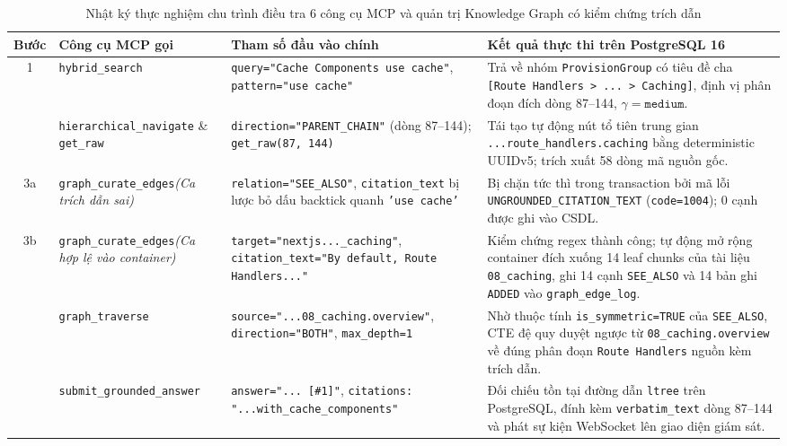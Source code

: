 \begin{table}[H]
\centering
\caption{Nhật ký thực nghiệm chu trình điều tra 6 công cụ MCP và quản trị Knowledge Graph có kiểm chứng trích dẫn}
\label{tab:mcp_kg_trajectory}
\scriptsize\setlength{\tabcolsep}{3.5pt}\begin{tabularx}{\textwidth}{c>{\raggedright\arraybackslash}p{3.0cm}>{\raggedright\arraybackslash}p{4.1cm}>{\raggedright\arraybackslash}X}
\toprule
\textbf{Bước} & \textbf{Công cụ MCP gọi} & \textbf{Tham số đầu vào chính} & \textbf{Kết quả thực thi trên PostgreSQL 16} \\
\midrule
1 & \texttt{hybrid\_\allowbreak search} & \texttt{query="Cache Components use cache"}, \texttt{pattern="use cache"} & Trả về nhóm \texttt{ProvisionGroup} có tiêu đề cha \texttt{[Route Handlers > ... > Caching]}, định vị phân đoạn đích dòng 87--144, $\gamma = \texttt{medium}$. \\
\addlinespace[2pt]
2 & \texttt{hierarchical\_\allowbreak navigate} \& \texttt{get\_raw} & \texttt{direction="PARENT\_\allowbreak CHAIN"} (dòng 87--144); \texttt{get\_raw(87, 144)} & Tái tạo tự động nút tổ tiên trung gian \texttt{...route\_\allowbreak handlers.\allowbreak caching} bằng deterministic UUIDv5; trích xuất 58 dòng mã nguồn gốc. \\
\addlinespace[2pt]
3a & \texttt{graph\_\allowbreak curate\_\allowbreak edges}\newline \textit{(Ca trích dẫn sai)} & \texttt{relation="SEE\_ALSO"}, \texttt{citation\_\allowbreak text} bị lược bỏ dấu backtick quanh \texttt{'use cache'} & Bị chặn tức thì trong transaction bởi mã lỗi \texttt{UNGROUNDED\_\allowbreak CITATION\_\allowbreak TEXT} (\texttt{code=1004}); 0 cạnh được ghi vào CSDL. \\
\addlinespace[2pt]
3b & \texttt{graph\_\allowbreak curate\_\allowbreak edges}\newline \textit{(Ca hợp lệ vào container)} & \texttt{target="nextjs...\allowbreak 08\_caching"}, \texttt{citation\_\allowbreak text="By default, Route Handlers..."} & Kiểm chứng regex thành công; tự động mở rộng container đích xuống 14 leaf chunks của tài liệu \texttt{08\_caching}, ghi 14 cạnh \texttt{SEE\_ALSO} và 14 bản ghi \texttt{ADDED} vào \texttt{graph\_\allowbreak edge\_\allowbreak log}. \\
\addlinespace[2pt]
4 & \texttt{graph\_\allowbreak traverse} & \texttt{source="...08\_\allowbreak caching.\allowbreak overview"}, \texttt{direction="BOTH"}, \texttt{max\_depth=1} & Nhờ thuộc tính \texttt{is\_symmetric=TRUE} của \texttt{SEE\_ALSO}, CTE đệ quy duyệt ngược từ \texttt{08\_\allowbreak caching.\allowbreak overview} về đúng phân đoạn \texttt{Route Handlers} nguồn kèm trích dẫn. \\
\addlinespace[2pt]
5 & \texttt{submit\_\allowbreak grounded\_\allowbreak answer} & \texttt{answer="... [\#1]"}, \texttt{citations: "...with\_\allowbreak cache\_\allowbreak components"} & Đối chiếu tồn tại đường dẫn \texttt{ltree} trên PostgreSQL, đính kèm \texttt{verbatim\_\allowbreak text} dòng 87--144 và phát sự kiện WebSocket lên giao diện giám sát. \\
\bottomrule
\end{tabularx}
\end{table}

